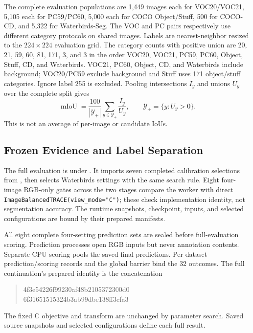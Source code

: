 The complete evaluation populations are 1,449 images each for VOC20/VOC21, 5,105 each for PC59/PC60, 5,000 each for COCO Object/Stuff, 500 for COCO-CD, and 5,322 for Waterbirds-Seg. The VOC and PC pairs respectively use different category protocols on shared images. Labels are nearest-neighbor resized to the $224\times224$ evaluation grid. The category counts with positive union are 20, 21, 59, 60, 81, 171, 3, and 3 in the order VOC20, VOC21, PC59, PC60, Object, Stuff, CD, and Waterbirds. VOC21, PC60, Object, CD, and Waterbirds include background; VOC20/PC59 exclude background and Stuff uses 171 object/stuff categories. Ignore label 255 is excluded. Pooling intersections $I_y$ and unions $U_y$ over the complete split gives
\begin{equation}
\operatorname{mIoU}=\frac{100}{|\mathcal Y_+|}
\sum_{y\in\mathcal Y_+}\frac{I_y}{U_y},
\qquad \mathcal Y_+=\{y:U_y>0\}.
\end{equation}
This is not an average of per-image or candidate IoUs.

\subsection{Frozen Evidence and Label Separation}
The full evaluation is  under . It imports seven completed calibration selections from , then selects Waterbirds settings with the same search rule. Eight four-image RGB-only gates across the two stages compare the worker with direct \texttt{ImageBalancedTRACE(view\_mode="C")}; these check implementation identity, not segmentation accuracy. The runtime snapshots, checkpoint, inputs, and selected configurations are bound by their prepared manifests.

All eight complete four-setting prediction sets are sealed before full-evaluation scoring. Prediction processes open RGB inputs but never annotation contents. Separate CPU scoring pools the saved final predictions. Per-dataset prediction/scoring records and the global barrier bind the 32 outcomes. The full continuation's prepared identity is the concatenation
\begin{quote}\small\ttfamily
4f3e54226f99230af48b2105372300d0\\
6f31651515324b3ab99dbe138ff3cfa3
\end{quote}
The fixed C objective and transform are unchanged by parameter search. Saved source snapshots and selected configurations define each full result.

